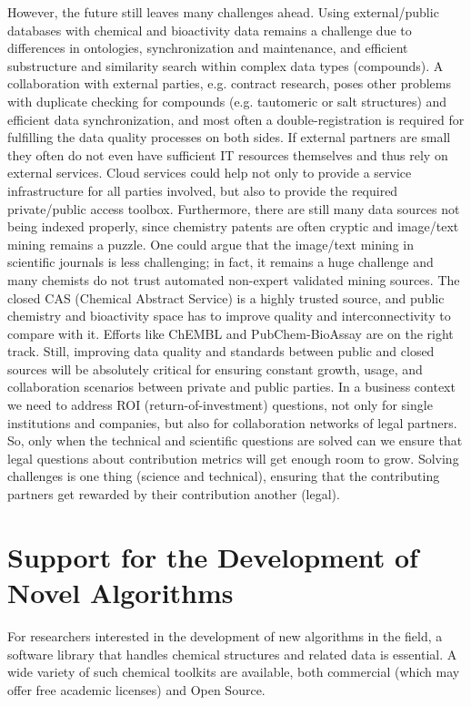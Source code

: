 \documentclass{sig-alternate}
\begin{document}
However, the future still leaves many challenges ahead. Using
external/public databases with chemical and bioactivity data remains a
challenge due to differences in ontologies, synchronization and
maintenance, and efficient substructure and similarity search within
complex data types (compounds). A collaboration with external parties,
e.g. contract research, poses other problems with duplicate checking
for compounds (e.g. tautomeric or salt structures) and efficient data
synchronization, and most often a double-registration is required for
fulfilling the data quality processes on both sides. If external
partners are small they often do not even have sufficient IT resources
themselves and thus rely on external services. Cloud services could
help not only to provide a service infrastructure for all parties
involved, but also to provide the required private/public access
toolbox. Furthermore, there are still many data sources not being
indexed properly, since chemistry patents are often cryptic and
image/text mining remains a puzzle. One could argue that the
image/text mining in scientific journals is less challenging; in fact,
it remains a huge challenge and many chemists do not trust automated
non-expert validated mining sources. The closed CAS (Chemical Abstract
Service) is a highly trusted source, and public chemistry and
bioactivity space has to improve quality and interconnectivity to
compare with it. Efforts like ChEMBL and PubChem-BioAssay are on the
right track. Still, improving data quality and standards between
public and closed sources will be absolutely critical for ensuring
constant growth, usage, and collaboration scenarios between private
and public parties.  In a business context we need to address ROI
(return-of-investment) questions, not only for single institutions and
companies, but also for collaboration networks of legal partners.  So,
only when the technical and scientific questions are solved can we
ensure that legal questions about contribution metrics will get enough
room to grow. Solving challenges is one thing (science and technical),
ensuring that the contributing partners get rewarded by their
contribution another (legal).

\section{Support for the Development of Novel Algorithms}
\label{sec:development-support}

For researchers interested in the development of new algorithms in the
field, a software library that handles chemical structures and related
data is essential. A wide variety of such chemical toolkits are
available, both commercial (which may offer free academic
licenses) and Open Source. 
\end{document}
